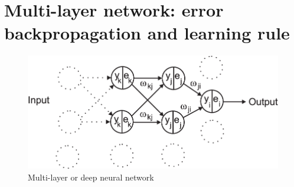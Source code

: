 \documentclass[12pt]{article}
\begin{document}
\section{Multi-layer network: error backpropagation and learning rule}
\begin{figure}[!hbt]
\begin{center}
\mbox{\includegraphics[width=\textwidth]{multi_layer}}
\end{center}
\caption{Multi-layer or deep neural network
\label{multi_layer}}
\end{figure}
\end{document}
